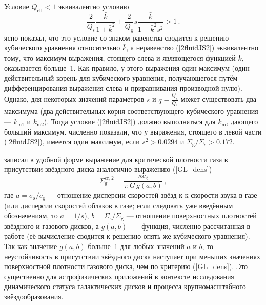 \documentclass[russian,12pt]{article}
\begin{document}
Условие $Q_\mathrm{eff} < 1$ эквивалентно условию 
\begin{equation}
\frac{2}{Q_\mathrm{s}} \frac{\bar{k}}{1 + \bar{k}^2} + 
\frac{2}{Q_\mathrm{g}} s \frac{\bar{k}}{1 + \bar{k}^2 s^2} > 1 \, .
\label{2fluidJS2}
\end{equation}
\cite{Elmegreen95} ясно показал, что это условие со знаком равенства 
сводится к решению кубического уравнения относительно $\bar{k}$, а 
неравенство (\ref{2fluidJS2}) эквивалентно тому, что максимум 
выражения, стоящего слева и являющегося функцией $\bar{k}$, 
оказывается больше~1. Как правило, у этого выражения один максимум 
(один действительный корень для кубического уравнения, получающегося 
путём дифференцирования выражения слева и приравнивания производной 
нулю). Однако, для некоторых значений параметров 
$s$ и $\displaystyle q \equiv \frac{Q_\mathrm{g}}{Q_\mathrm{s}}$ может 
существовать два максимума (два действительных корня соответствующего 
кубического уравнения --- $\bar{k}_\mathrm{m1}$ и 
$\bar{k}_\mathrm{m2}$). Тогда условие (\ref{2fluidJS2}) должно 
выполняться для $\bar{k}_\mathrm{m}$, дающего больший максимум. 
\cite{BR88} численно показали, что у выражения, стоящего в левой части 
(\ref{2fluidJS2}), имеется один максимум, если $s^2 > 0.0294$ и 
$\Sigma_\mathrm{g}/\Sigma_\mathrm{s} > 0.172$. 

\cite{Efstathiou00} записал в удобной форме выражение для критической 
плотности газа в присутствии звёздного диска аналогично выражению 
(\ref{GL_dens})
\begin{equation}
\Sigma_\mathrm{g}^\mathrm{cr,2} = 
\frac{\kappa c_\mathrm{g}}{\pi\, G\, g(a,b)} \, ,
\label{2fluid}
\end{equation}
где $a = \sigma_\mathrm{s}/c_\mathrm{g}$ --- отношение дисперсии скоростей 
звёзд к к скорости звука в газе (или дисперсии скоростей облаков в газе; 
если следовать уже введённым обозначениям, то $a = 1/s$), 
$b = \Sigma_\mathrm{s}/\Sigma_\mathrm{g}$ --- отношение поверхностных 
плотностей звёздного и газового дисков, 
а $g(a,b)$~---~функция, численно рассчитанная в работе \citet{Efstathiou00} 
(её вычисление сводится к решению опять же кубического уравнения). 
Так как значение $g(a,b)$ больше~1 для любых значений $a$ и $b$, то 
неустойчивость в присутствии звёздного диска наступает при меньших значениях 
поверхностной плотности газового диска, чем по критерию 
(\ref{GL_dens}). Это существенно для астрофизических приложений в 
контексте исследования динамического статуса галактических дисков и 
процесса крупномасштабного звёздообразования.
\end{document}
